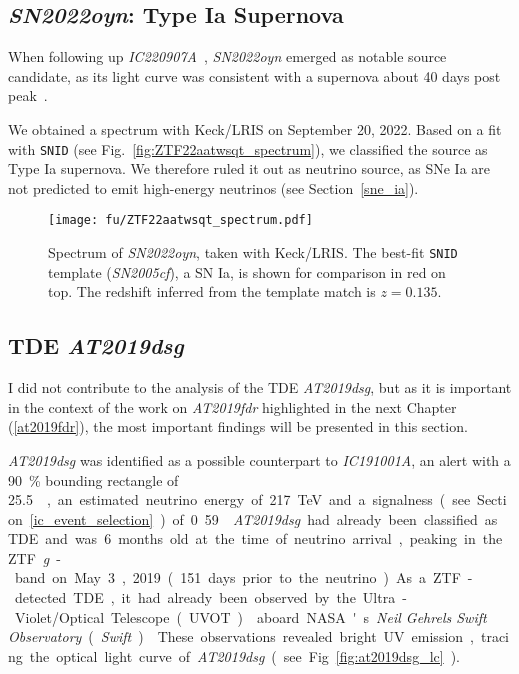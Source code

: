 \pagebreak

\subsection{\textit{SN2022oyn}: Type Ia Supernova}
When following up \emph{IC220907A}~, \emph{SN2022oyn} emerged as notable source candidate, as its light curve was consistent with a supernova about 40 days post peak~.

We obtained a spectrum with Keck/LRIS on September 20, 2022. Based on a fit with \texttt{SNID} (see Fig.~\ref{fig:ZTF22aatwsqt_spectrum}), we classified the source as Type Ia supernova. We therefore ruled it out as neutrino source, as SNe Ia are not predicted to emit high-energy neutrinos (see Section~\ref{sne_ia}).

\begin{figure}[htb]
    \texttt{[image: fu/ZTF22aatwsqt\_spectrum.pdf]}
    \caption[\emph{SN2022oyn} spectrum]{Spectrum of \emph{SN2022oyn}, taken with Keck/LRIS. The best-fit \texttt{SNID} template (\emph{SN2005cf}), a SN Ia, is shown for comparison in red on top. The redshift inferred from the template match is $z=0.135$.}
\end{figure}

\subsection{TDE \emph{AT2019dsg}}\label{at2019dsg}
I did not contribute to the analysis of the TDE \emph{AT2019dsg}, but as it is important in the context of the work on \emph{AT2019fdr} highlighted in the next Chapter (\ref{at2019fdr}), the most important findings will be presented in this section.

\emph{AT2019dsg} was identified as a possible counterpart to \emph{IC191001A}, an alert with a \SI{90}{\percent} bounding rectangle of \SI{25.5}{\square\deg}, an estimated neutrino energy of \SI{217}{\tera\eV} and a signalness (see Section~\ref{ic_event_selection}) of 0.59~.

\emph{AT2019dsg} had already been classified as TDE and was 6 months old at the time of neutrino arrival, peaking in the ZTF \textit{g}-band on May 3, 2019 (151 days prior to the neutrino). As a ZTF-detected TDE, it had already been observed by the Ultra-Violet/Optical Telescope (UVOT)~ aboard NASA's \textit{Neil Gehrels Swift Observatory} (\textit{Swift})~. These observations revealed bright UV emission, tracing the optical light curve of \emph{AT2019dsg} (see Fig.~\ref{fig:at2019dsg_lc}).

